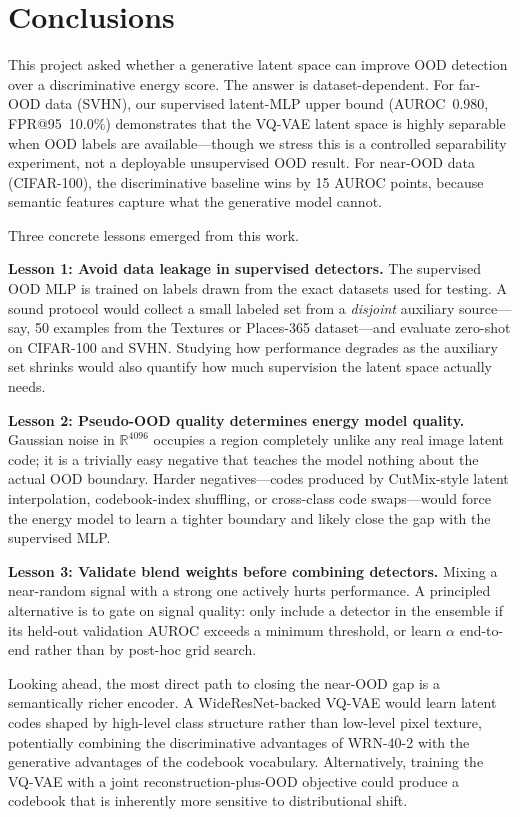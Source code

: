 \documentclass[10pt,twocolumn,letterpaper]{article}
\begin{document}
\section{Conclusions}
\label{sec:conclusions}

This project asked whether a generative latent space can
improve OOD detection over a discriminative energy score.
The answer is dataset-dependent.
For far-OOD data (SVHN), our supervised latent-MLP upper
bound (AUROC~0.980, FPR@95~10.0\%) demonstrates that
the VQ-VAE latent space is highly separable when OOD
labels are available---though we stress this is a
controlled separability experiment, not a deployable
unsupervised OOD result.
For near-OOD data (CIFAR-100), the discriminative baseline
wins by 15 AUROC points, because semantic features capture
what the generative model cannot.

Three concrete lessons emerged from this work.

\textbf{Lesson 1: Avoid data leakage in supervised detectors.}
The supervised OOD MLP is trained on labels drawn from the
exact datasets used for testing.
A sound protocol would collect a small labeled set from a
\emph{disjoint} auxiliary source---say, 50 examples from
the Textures or Places-365 dataset---and evaluate zero-shot
on CIFAR-100 and SVHN.
Studying how performance degrades as the auxiliary set
shrinks would also quantify how much supervision the latent
space actually needs.

\textbf{Lesson 2: Pseudo-OOD quality determines energy model quality.}
Gaussian noise in $\mathbb{R}^{4096}$ occupies a region
completely unlike any real image latent code; it is a
trivially easy negative that teaches the model nothing
about the actual OOD boundary.
Harder negatives---codes produced by CutMix-style latent
interpolation, codebook-index shuffling, or cross-class
code swaps---would force the energy model to learn a
tighter boundary and likely close the gap with the
supervised MLP.

\textbf{Lesson 3: Validate blend weights before combining detectors.}
Mixing a near-random signal with a strong one actively
hurts performance.
A principled alternative is to gate on signal quality:
only include a detector in the ensemble if its held-out
validation AUROC exceeds a minimum threshold, or learn
$\alpha$ end-to-end rather than by post-hoc grid search.

Looking ahead, the most direct path to closing the near-OOD
gap is a semantically richer encoder.
A WideResNet-backed VQ-VAE would learn latent codes shaped
by high-level class structure rather than low-level pixel
texture, potentially combining the discriminative advantages
of WRN-40-2 with the generative advantages of the codebook
vocabulary.
Alternatively, training the VQ-VAE with a joint
reconstruction-plus-OOD objective could produce a codebook
that is inherently more sensitive to distributional shift.
\end{document}
